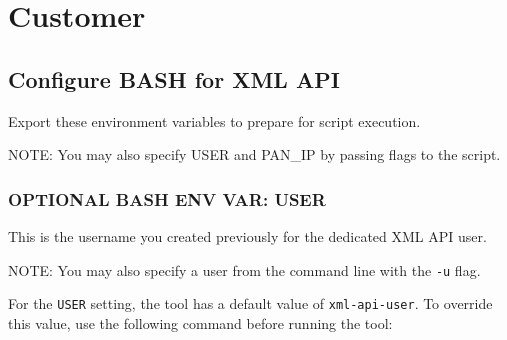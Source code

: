 \hypertarget{customer}{%
\section{Customer}\label{customer}}

\hypertarget{configure-bash-for-xml-api}{%
\subsection{Configure BASH for XML
API}\label{configure-bash-for-xml-api}}

Export these environment variables to prepare for script execution.

NOTE: You may also specify USER and PAN\_IP by passing flags to the
script.

\begin{Shaded}
\begin{Highlighting}[]
 \OperatorTok{\textless{}}\OperatorTok{\textgreater{}}
 \OperatorTok{\textless{}}\OperatorTok{\textgreater{}}
 \OperatorTok{\textless{}}\OperatorTok{\textgreater{}}
\end{Highlighting}
\end{Shaded}

\hypertarget{optional-bash-env-var-user}{%
\subsubsection{OPTIONAL BASH ENV VAR:
USER}\label{optional-bash-env-var-user}}

This is the username you created previously for the dedicated XML API
user.

NOTE: You may also specify a user from the command line with the
\texttt{-u} flag.

For the \texttt{USER} setting, the tool has a default value of
\texttt{xml-api-user}. To override this value, use the following command
before running the tool:

\begin{Shaded}
\begin{Highlighting}[]
 \NormalTok{ \# }  
  
\end{Highlighting}
\end{Shaded}

